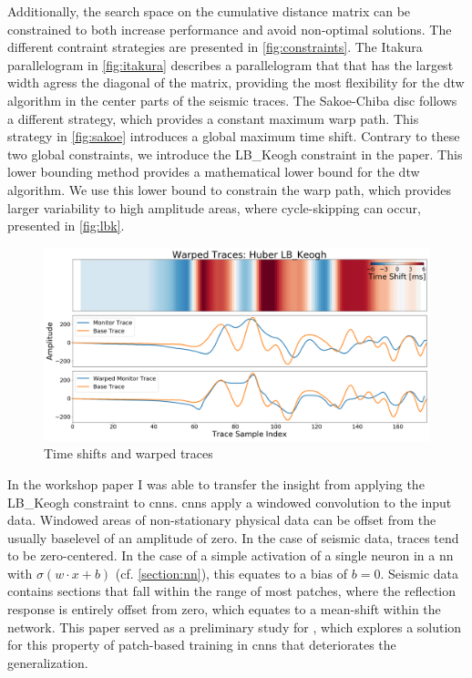 Additionally, the search space on the cumulative distance matrix can be constrained to both increase performance and avoid non-optimal solutions. The different contraint strategies are presented in \cref{fig:constraints}. The Itakura parallelogram \citep{Itakura1975} in \cref{fig:itakura} describes a parallelogram that that has the largest width agress the diagonal of the matrix, providing the most flexibility for the \ac{dtw} algorithm in the center parts of the seismic traces. The Sakoe-Chiba disc \citep{Sakoe1978} follows a different strategy, which provides a constant maximum warp path. This strategy in \cref{fig:sakoe} introduces a global maximum time shift. Contrary to these two global constraints, we introduce the LB\_Keogh \citep{keogh2005exact} constraint in the paper. This lower bounding method provides a mathematical lower bound for the \ac{dtw} algorithm. We use this lower bound to constrain the warp path, which provides larger variability to high amplitude areas, where cycle-skipping can occur, presented in \cref{fig:lbk}. 

\begin{figure}[!ht]
    \centering
    \includegraphics[width=\textwidth]{figures/time_shift_huber_lb_keogh.png}
    \caption{Time shifts and warped traces \citep[from][]{dramsch2019dtw}}
    \label{fig:time-shifts-warped}
\end{figure}

In the workshop paper  I was able to transfer the insight from applying the LB\_Keogh constraint to \aclp{cnn}. \acp{cnn} apply a windowed convolution to the input data. Windowed areas of non-stationary physical data can be offset from the usually baselevel of an amplitude of zero. In the case of seismic data, traces tend to be zero-centered. In the case of a simple activation of a single neuron in a \ac{nn} with $\sigma(w\cdot x + b)$ (cf. \cref{section:nn}), this equates to a bias of $b=0$. Seismic data contains sections that fall within the range of most patches, where the reflection response is entirely offset from zero, which equates to a mean-shift within the network. This paper served as a preliminary study for \citet{dramsch2019complex}, which explores a solution for this property of patch-based training in \acp{cnn} that deteriorates the generalization.

